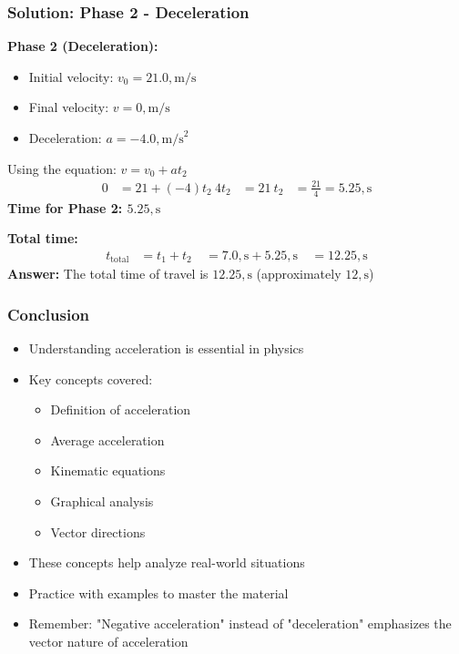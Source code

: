 \documentclass{beamer}
\begin{document}
\begin{frame}
\frametitle{Solution: Phase 2 - Deceleration}
\textbf{Phase 2 (Deceleration):}
\begin{itemize}
\item Initial velocity: $v_0 = 21.0 , \text{m/s}$
\item Final velocity: $v = 0 , \text{m/s}$
\item Deceleration: $a = -4.0 , \text{m/s}^2$
\end{itemize}
Using the equation: $v = v_0 + at_2$
\begin{align*}
0 &= 21 + (-4)t_2 \
4t_2 &= 21 \
t_2 &= \frac{21}{4} = 5.25 , \text{s}
\end{align*}
\textbf{Time for Phase 2: $5.25 , \text{s}$}

\textbf{Total time:}
\begin{align*}
t_{\text{total}} &= t_1 + t_2 \
&= 7.0 , \text{s} + 5.25 , \text{s} \
&= 12.25 , \text{s}
\end{align*}
\textbf{Answer:} The total time of travel is $12.25 , \text{s}$ (approximately $12 , \text{s}$)


\end{frame}

\begin{frame}
\frametitle{Conclusion}
\begin{itemize}
    \item Understanding acceleration is essential in physics
    \item Key concepts covered:
    \begin{itemize}
        \item Definition of acceleration
        \item Average acceleration
        \item Kinematic equations
        \item Graphical analysis
        \item Vector directions
    \end{itemize}
    \item These concepts help analyze real-world situations
    \item Practice with examples to master the material
    \item Remember: "Negative acceleration" instead of "deceleration" emphasizes the vector nature of acceleration
\end{itemize}
\end{frame}
\end{document}
